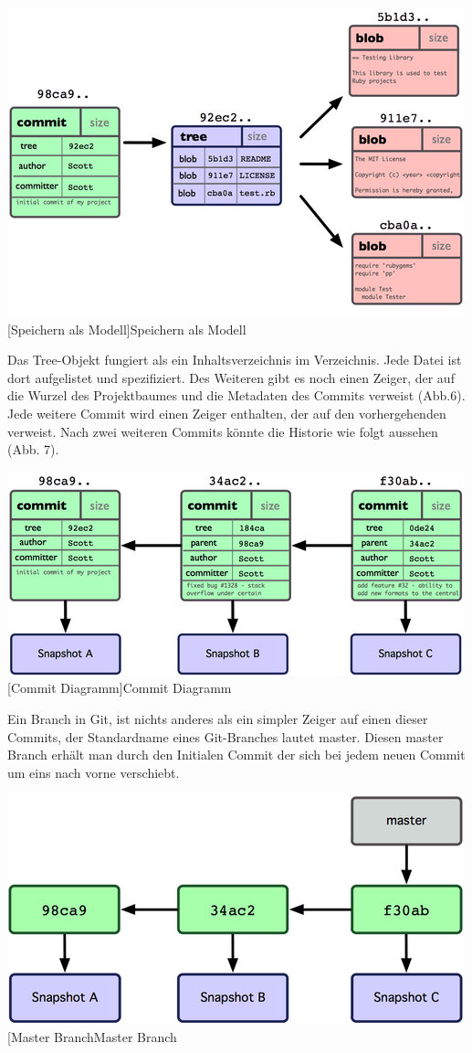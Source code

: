 \documentclass[12pt,a4paper,bibliography=totocnumbered,listof=totocnumbered]{scrartcl}
\begin{document}
\vspace{1em}
\begin{minipage}{\linewidth}
	\centering
	\includegraphics[width=0.6\linewidth]{Bilder/speichern.png}
	[Speichern als Modell]{Speichern als Modell\footnotemark }
	\label{Speichern als Modell}
\end{minipage} 	

Das Tree-Objekt  fungiert als ein Inhaltsverzeichnis im Verzeichnis. Jede Datei ist dort aufgelistet und  spezifiziert. Des Weiteren gibt es noch einen  Zeiger, der auf die Wurzel des Projektbaumes und die Metadaten des Commits verweist (Abb.6).	 
Jede weitere Commit wird einen Zeiger enthalten, der auf den vorhergehenden verweist. Nach zwei weiteren Commits könnte die Historie wie folgt aussehen (Abb. 7).

\vspace{1em}
\begin{minipage}{\linewidth}
	\centering
	\includegraphics[width=0.6\linewidth]{Bilder/commit.png}
	[Commit Diagramm]{Commit Diagramm\footnotemark }
	\label{Commit Diagramm}
\end{minipage} 	

Ein Branch in Git, ist nichts anderes als ein simpler Zeiger auf einen dieser Commits, der Standardname eines Git-Branches lautet master. Diesen master Branch erhält man durch den Initialen Commit der sich bei jedem neuen Commit um eins nach vorne verschiebt.
\newline

\vspace{2em}
\begin{minipage}{\linewidth}
	\centering
	\includegraphics[width=0.6\linewidth]{Bilder/master.png}
	[Master Branch{Master Branch\footnotemark }
	\label{Master Branch}
\end{minipage} 
\end{document}
